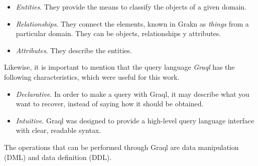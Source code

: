 \begin{itemize}
    \item \textit{Entities}. They provide the means to classify the objects of a given domain.
    \item \textit{Relationships}. They connect the elements, known in Grakn as \textit{things} from a particular domain. They can be objects, relationships y attributes.
    \item \textit{Attributes}. They describe the entities.
\end{itemize}

Likewise, it is important to mention that the query language \textit{Graql} has the following characteristics, which were useful for this work.

\begin{itemize}
    \item \textit{Declarative}. In order to make a query with Graql, it may describe what you want to recover, instead of saying how it should be obtained.
    \item \textit{Intuitive}. Graql was designed to provide a high-level query language interface with clear, readable syntax.
\end{itemize}

The operations that can be performed through Graql are data manipulation (DML) and data definition (DDL).

